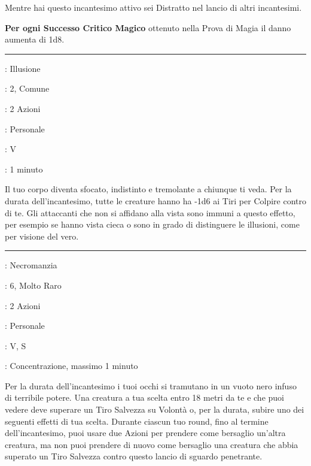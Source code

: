 \begin{multicols}{2}
Mentre hai questo incantesimo attivo sei Distratto nel lancio di altri incantesimi.

\textbf{Per ogni Successo Critico Magico} ottenuto nella Prova di Magia il danno aumenta di 1d8.

\smallskip\noindent\rule{\linewidth}{2pt} \hypertarget{Sfocatura}{}\smallskip{}
\noindent
\begin{description}[noitemsep, topsep=0pt, parsep=0pt, partopsep=0pt, leftmargin=0cm, labelwidth=2.8cm]
	\item[\textbf{Lista di Magia}]: Illusione
	\item[\textbf{Livello}]: 2, Comune
	\item[\textbf{T. di Lancio}]: 2 Azioni
	\item[\textbf{Gittata}]: Personale
	\item[\textbf{Componenti}]: V
	\item[\textbf{Durata}]: 1 minuto
\end{description}

Il tuo corpo diventa sfocato, indistinto e tremolante a chiunque ti veda. Per la durata dell'incantesimo, tutte le creature hanno ha -1d6 ai Tiri per Colpire contro di te. Gli attaccanti che non si affidano alla vista sono immuni a questo effetto, per esempio se hanno vista cieca o sono in grado di distinguere le illusioni, come per visione del vero.

\smallskip\noindent\rule{\linewidth}{2pt} \hypertarget{Sguardo Penetrante}{}\smallskip{}
\noindent
\begin{description}[noitemsep, topsep=0pt, parsep=0pt, partopsep=0pt, leftmargin=0cm, labelwidth=2.8cm]
	\item[\textbf{Lista di Magia}]: Necromanzia
	\item[\textbf{Livello}]: 6, Molto Raro
	\item[\textbf{T. di Lancio}]: 2 Azioni
	\item[\textbf{Gittata}]: Personale
	\item[\textbf{Componenti}]: V, S
	\item[\textbf{Durata}]: Concentrazione, massimo 1 minuto
\end{description}

Per la durata dell'incantesimo i tuoi occhi si tramutano in un vuoto nero infuso di terribile potere. Una creatura a tua scelta entro 18 metri da te e che puoi vedere deve superare un Tiro Salvezza su Volontà o, per la durata, subire uno dei seguenti effetti di tua scelta. Durante ciascun tuo round, fino al termine dell'incantesimo, puoi usare due Azioni per prendere come bersaglio un'altra creatura, ma non puoi prendere di nuovo come bersaglio una creatura che abbia superato un Tiro Salvezza contro questo lancio di sguardo penetrante.


\end{multicols}
